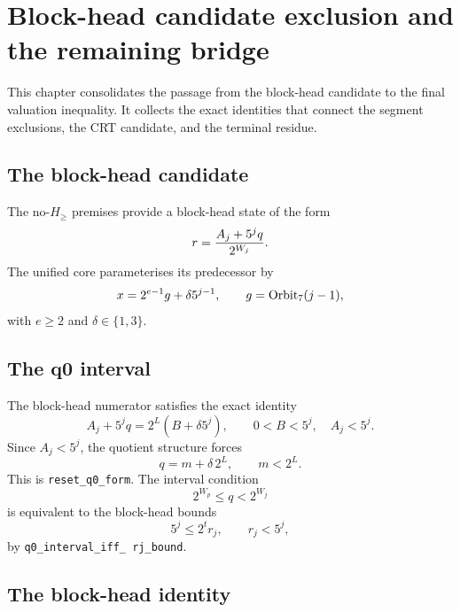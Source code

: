 \section{Block-head candidate exclusion and the remaining bridge}

This chapter consolidates the passage from the block-head candidate
to the final valuation inequality.  It collects the exact identities
that connect the segment exclusions, the CRT candidate, and the
terminal residue.

\subsection{The block-head candidate}

The no-$H_{\ge}$ premises provide a block-head state of the form
\begin{equation*}
  r=\frac{A_j+5^jq}{2^{W_j}}.
\end{equation*}
The unified core parameterises its predecessor by
\begin{equation*}
  x=2^{e-1}g+\delta5^{j-1},
  \qquad g=\mathrm{Orbit}_7(j-1),
\end{equation*}
with $e\ge2$ and $\delta\in\{1,3\}$.

\subsection{The q0 interval}

The block-head numerator satisfies the exact identity
\begin{equation*}
  A_j+5^jq=2^L\left(B+\delta5^j\right),
\qquad 0<B<5^j,\quad A_j<5^j.
\end{equation*}
Since $A_j<5^j$, the quotient structure forces
\begin{equation*}
  q=m+\delta\,2^L,
  \qquad m<2^L.
\end{equation*}
This is \texttt{reset\_\allowbreak q0\_\allowbreak form}.  The interval
condition
\begin{equation*}
  2^{W_p}\le q<2^{W_j}
\end{equation*}
is equivalent to the block-head bounds
\begin{equation*}
  5^j\le2^t r_j,\qquad r_j<5^j,
\end{equation*}
by \texttt{q0\_\allowbreak interval\_\allowbreak iff\_\allowbreak
rj\_\allowbreak bound}.

\subsection{The block-head identity}

